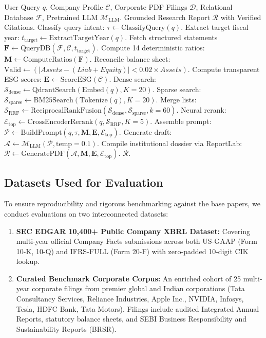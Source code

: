 \documentclass[conference]{IEEEtran}
\begin{document}
\begin{algorithm}[t]
\caption{Dual-Pathway Hybrid-RAG Financial Analysis}
\label{alg:pipeline}
\begin{algorithmic}[1]
\REQUIRE User Query $q$, Company Profile $\mathcal{C}$, Corporate PDF Filings $\mathcal{D}$, Relational Database $\mathcal{F}$, Pretrained LLM $\mathcal{M}_{\text{LLM}}$.
\ENSURE Grounded Research Report $\mathcal{R}$ with Verified Citations.
\STATE Classify query intent: $\tau \leftarrow \text{ClassifyQuery}(q)$.
\STATE Extract target fiscal year: $t_{\text{target}} \leftarrow \text{ExtractTargetYear}(q)$.
\STATE Fetch structured statements $\mathbf{F} \leftarrow \text{QueryDB}(\mathcal{F}, \mathcal{C}, t_{\text{target}})$.
\STATE Compute 14 deterministic ratios: $\mathbf{M} \leftarrow \text{ComputeRatios}(\mathbf{F})$.
\STATE Reconcile balance sheet: $\text{Valid} \leftarrow (|Assets - (Liab + Equity)| < 0.02 \times Assets)$.
\STATE Compute transparent ESG scores: $\mathbf{E} \leftarrow \text{ScoreESG}(\mathcal{C})$.
\STATE Dense search: $\mathcal{S}_{\text{dense}} \leftarrow \text{QdrantSearch}(\text{Embed}(q), K=20)$.
\STATE Sparse search: $\mathcal{S}_{\text{sparse}} \leftarrow \text{BM25Search}(\text{Tokenize}(q), K=20)$.
\STATE Merge lists: $\mathcal{S}_{\text{RRF}} \leftarrow \text{ReciprocalRankFusion}(\mathcal{S}_{\text{dense}}, \mathcal{S}_{\text{sparse}}, k=60)$.
\STATE Neural rerank: $\mathcal{E}_{\text{top}} \leftarrow \text{CrossEncoderRerank}(q, \mathcal{S}_{\text{RRF}}, K=5)$.
\STATE Assemble prompt: $\mathcal{P} \leftarrow \text{BuildPrompt}(q, \tau, \mathbf{M}, \mathbf{E}, \mathcal{E}_{\text{top}})$.
\STATE Generate draft: $\mathcal{A} \leftarrow \mathcal{M}_{\text{LLM}}(\mathcal{P}, \text{temp}=0.1)$.
\STATE Compile institutional dossier via ReportLab: $\mathcal{R} \leftarrow \text{GeneratePDF}(\mathcal{A}, \mathbf{M}, \mathbf{E}, \mathcal{E}_{\text{top}})$.
\RETURN $\mathcal{R}$.
\end{algorithmic}
\end{algorithm}

\subsection{Datasets Used for Evaluation}
To ensure reproducibility and rigorous benchmarking against the base papers, we conduct evaluations on two interconnected datasets:
\begin{enumerate}
    \item \textbf{SEC EDGAR 10,400+ Public Company XBRL Dataset:} Covering multi-year official Company Facts submissions across both US-GAAP (Form 10-K, 10-Q) and IFRS-FULL (Form 20-F) with zero-padded 10-digit CIK lookup.
    \item \textbf{Curated Benchmark Corporate Corpus:} An enriched cohort of 25 multi-year corporate filings from premier global and Indian corporations (Tata Consultancy Services, Reliance Industries, Apple Inc., NVIDIA, Infosys, Tesla, HDFC Bank, Tata Motors). Filings include audited Integrated Annual Reports, statutory balance sheets, and SEBI Business Responsibility and Sustainability Reports (BRSR).
\end{enumerate}
\end{document}
